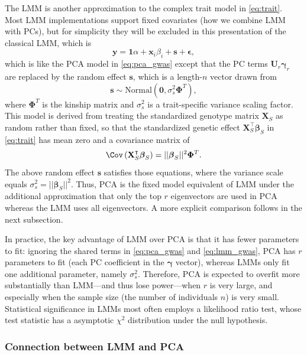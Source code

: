 \documentclass[11pt]{article}
\begin{document}
The LMM is another approximation to the complex trait model in \cref{eq:trait}.
Most LMM implementations support fixed covariates (how we combine LMM with PCs), but for simplicity they will be excluded in this presentation of the classical LMM, which is
\begin{equation}
  \label{eq:lmm_gwas}
  \mathbf{y}
  =
  \mathbf{1} \alpha + \mathbf{x}_i \beta_i + \mathbf{s} + \boldsymbol{\epsilon}
  ,
\end{equation}
which is like the PCA model in \cref{eq:pca_gwas} except that the PC terms $\mathbf{U}_r \boldsymbol{\gamma}_r$ are replaced by the random effect $\mathbf{s}$, which is a length-$n$ vector drawn from \citep{sul_population_2018}
$$
\mathbf{s} \sim \text{Normal} \left( \mathbf{0}, \sigma^2_s \mathbf{\Phi}^T \right),
$$
where $\mathbf{\Phi}^T$ is the kinship matrix and $\sigma^2_s$ is a trait-specific variance scaling factor.
This model is derived from treating the standardized genotype matrix $\mathbf{X}_S$ as random rather than fixed, so that the standardized genetic effect
$\mathbf{X}_S^\intercal \boldsymbol{\beta}_S$
in \cref{eq:trait} has mean zero and a covariance matrix of
$$
\Cov \left( \mathbf{X}_S^\intercal \boldsymbol{\beta}_S \right)
=
|| \boldsymbol{\beta}_S ||^2 \mathbf{\Phi}^T
.
$$
The above random effect $\mathbf{s}$ satisfies those equations, where the variance scale equals $\sigma^2_s = || \boldsymbol{\beta}_S ||^2$.
Thus, PCA is the fixed model equivalent of LMM under the additional approximation that only the top $r$ eigenvectors are used in PCA whereas the LMM uses all eigenvectors.
A more explicit comparison follows in the next subsection.

In practice, the key advantage of LMM over PCA is that it has fewer parameters to fit: ignoring the shared terms in \cref{eq:pca_gwas} and \cref{eq:lmm_gwas}, PCA has $r$ parameters to fit (each PC coefficient in the $\boldsymbol{\gamma}$ vector), whereas LMMs only fit one additional parameter, namely $\sigma^2_s$.
Therefore, PCA is expected to overfit more substantially than LMM---and thus lose power---when $r$ is very large, and especially when the sample size (the number of individuals $n$) is very small.
Statistical significance in LMMs most often employs a likelihood ratio test, whose test statistic has a asymptotic $\chi^2$ distribution under the null hypothesis.

\subsubsection{Connection between LMM and PCA}
\end{document}

